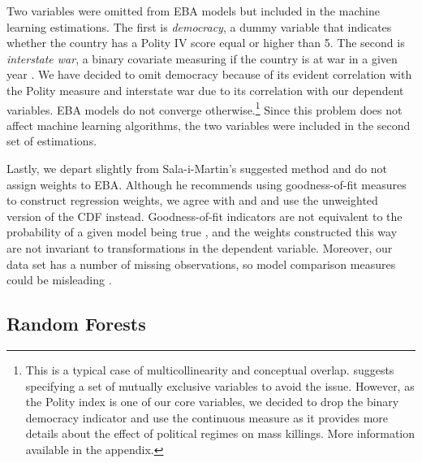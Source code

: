 \documentclass[a4paper,12pt]{article}
\begin{document}
Two variables were omitted from EBA models but included in the machine learning estimations. The first is \textit{democracy}, a dummy variable that indicates whether the country has a Polity IV score equal or higher than 5. The second is \textit{interstate war}, a binary covariate measuring if the country is at war in a given year \citep{sarkees2010resort}. We have decided to omit democracy because of its evident correlation with the Polity measure and interstate war due to its correlation with our dependent variables. EBA models do not converge otherwise.\footnote{This is a typical case of multicollinearity and conceptual overlap. \citet{hlavac2016eba} suggests specifying a set of mutually exclusive variables to avoid the issue. However, as the Polity index is one of our core variables, we decided to drop the binary democracy indicator and use the continuous measure as it provides more details about the effect of political regimes on mass killings. More information available in the appendix.}  Since this problem does not affect machine learning algorithms, the two variables were included in the second set of estimations.
	
Lastly, we depart slightly from Sala-i-Martin's suggested method and do not assign weights to EBA. Although he recommends using goodness-of-fit measures to construct regression weights, we agree with \citet{sturm2002robust} and \citet[299]{gassebner2016expect} and use the unweighted version of the CDF instead. Goodness-of-fit indicators are not equivalent to the probability of a given model being true \citep{anscombe1973graphs,king1986not}, and the weights constructed this way are not invariant to transformations in the dependent variable. Moreover, our data set has a number of missing observations, so model comparison measures could be misleading \citep{lall2016multiple}.
	
\subsection{Random Forests}
\label{sub:drf}
\end{document}
